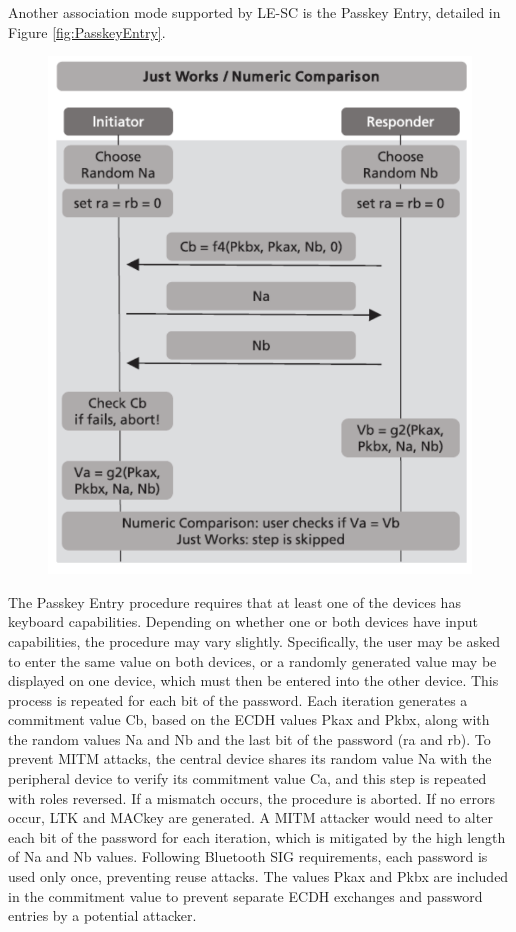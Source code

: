 \documentclass{Configuration_Files/PoliMi3i_thesis}
\begin{document}
Another association mode supported by LE-SC is the Passkey Entry, detailed in Figure \ref{fig:PasskeyEntry}.

\begin{figure}[H]
    \centering
    \includegraphics[scale=0.7]{Bluetooth_Security/6.png}
    \label{fig:pairing_procedure}
\end{figure}

The Passkey Entry procedure requires that at least one of the devices has keyboard capabilities. Depending on whether one or both devices have input capabilities, the procedure may vary slightly. Specifically, the user may be asked to enter the same value on both devices, or a randomly generated value may be displayed on one device, which must then be entered into the other device. This process is repeated for each bit of the password. Each iteration generates a commitment value Cb, based on the ECDH values Pkax and Pkbx, along with the random values Na and Nb and the last bit of the password (ra and rb). To prevent MITM attacks, the central device shares its random value Na with the peripheral device to verify its commitment value Ca, and this step is repeated with roles reversed. If a mismatch occurs, the procedure is aborted. If no errors occur, LTK and MACkey are generated. A MITM attacker would need to alter each bit of the password for each iteration, which is mitigated by the high length of Na and Nb values. Following Bluetooth SIG requirements, each password is used only once, preventing reuse attacks. The values Pkax and Pkbx are included in the commitment value to prevent separate ECDH exchanges and password entries by a potential attacker.
\end{document}

